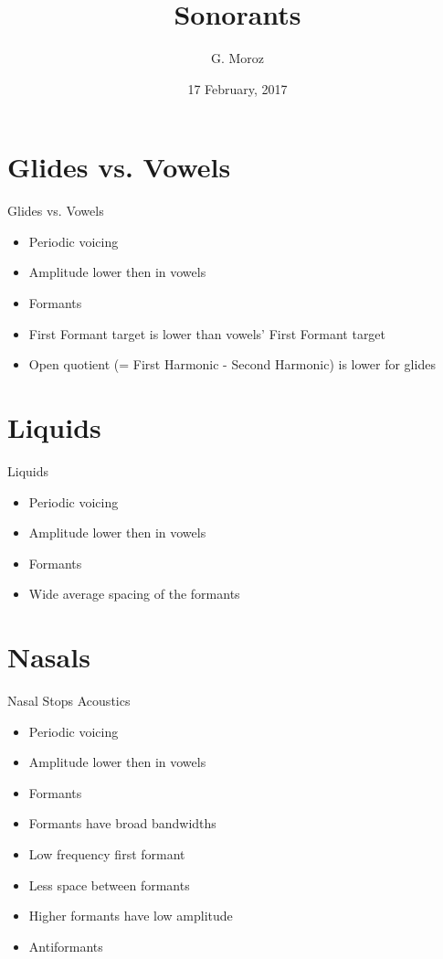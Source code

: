 \title[]{Sonorants}
\author[]{G. Moroz}
\date{17 February, 2017}

\frame{\titlepage}

\section{Glides vs. Vowels}
\begin{frame}{Glides vs. Vowels}
\begin{itemize}
\item Periodic voicing
\item Amplitude lower then in vowels
\item Formants
\item First Formant target is lower than vowels' First Formant target
\item Open quotient (= First Harmonic - Second Harmonic) is lower for glides
\end{itemize}
\end{frame}

\section{Liquids}
\begin{frame}{Liquids}
\begin{itemize}
\item Periodic voicing
\item Amplitude lower then in vowels
\item Formants
\item Wide average spacing of the formants
\end{itemize}
\end{frame}

\section{Nasals}
\begin{frame}{Nasal Stops Acoustics}
\begin{itemize}
\item Periodic voicing
\item Amplitude lower then in vowels
\item Formants
\item Formants have broad bandwidths
\item Low frequency first formant
\item Less space between formants
\item Higher formants have low amplitude
\item Antiformants
\end{itemize}
\end{frame}

